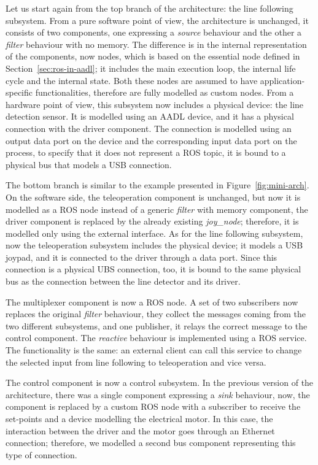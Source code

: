 Let us start again from the top branch of the architecture: the line following subsystem. From a pure software point of view, the architecture is unchanged, it consists of two components, one expressing a \textit{source} behaviour and the other a \textit{filter} behaviour with no memory. The difference is in the internal representation of the components, now nodes, which is based on the essential node defined in Section~\ref{sec:ros-in-aadl}; it includes the main execution loop, the internal life cycle and the internal state. Both these nodes are assumed to have application-specific functionalities, therefore are fully modelled as custom nodes. From a hardware point of view, this subsystem now includes a physical device: the line detection sensor. It is modelled using an AADL device, and it has a physical connection with the driver component. The connection is modelled using an output data port on the device and the corresponding input data port on the process, to specify that it does not represent a ROS topic, it is bound to a physical bus that models a USB connection.

The bottom branch is similar to the example presented in Figure~\ref{fig:mini-arch}. On the software side, the teleoperation component is unchanged, but now it is modelled as a ROS node instead of a generic \textit{filter} with memory component, the driver component is replaced by the already existing \textit{joy\_node}; therefore, it is modelled only using the external interface. As for the line following subsystem, now the teleoperation subsystem includes the physical device; it models a USB joypad, and it is connected to the driver through a data port. Since this connection is a physical UBS connection, too, it is bound to the same physical bus as the connection between the line detector and its driver.

The multiplexer component is now a ROS node. A set of two subscribers now replaces the original \textit{filter} behaviour, they collect the messages coming from the two different subsystems, and one publisher, it relays the correct message to the control component. The \textit{reactive} behaviour is implemented using a ROS service. The functionality is the same: an external client can call this service to change the selected input from line following to teleoperation and vice versa.

The control component is now a control subsystem. In the previous version of the architecture, there was a single component expressing a \textit{sink} behaviour, now, the component is replaced by a custom ROS node with a subscriber to receive the set-points and a device modelling the electrical motor. In this case, the interaction between the driver and the motor goes through an Ethernet connection; therefore, we modelled a second bus component representing this type of connection.

